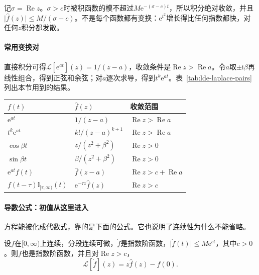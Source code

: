 记$\sigma=\operatorname{Re}z$。$\sigma>c$时被积函数的模不超过$M\mathrm{e}^{-(\sigma-c)t}$，所以积分绝对收敛，并且$\lvert\hat{f}(z)\rvert\leq M/(\sigma-c)$。不是每个函数都有变换：$\mathrm{e}^{t^2}$增长得比任何指数都快，对任何$z$积分都发散。

\paragraph{常用变换对}
直接积分可得$\mathcal{L}[\mathrm{e}^{at}](z)=1/(z-a)$，收敛条件是$\operatorname{Re}z>\operatorname{Re}a$。令$a$取$\pm\mathrm{i}\beta$再线性组合，得到正弦和余弦；对$a$逐次求导，得到$t^k\mathrm{e}^{at}$。表~\ref{tab:lde-laplace-pairs}列出本节用到的结果。

\begin{BookInlineTable}
  \centering
  \caption{常用的单边Laplace变换对，$k$为非负整数，$a\in\mathbb{C}$，$\beta,\tau$为实数，$\tau\geq0$。}
  \label{tab:lde-laplace-pairs}
  \begin{tabular}{lll}
    \toprule
    $f(t)$ & $\hat{f}(z)$ & 收敛范围\\
    \midrule
    $\mathrm{e}^{at}$ & $1/(z-a)$ & $\operatorname{Re}z>\operatorname{Re}a$\\
    $t^k\mathrm{e}^{at}$ & $k!/(z-a)^{k+1}$ & $\operatorname{Re}z>\operatorname{Re}a$\\
    $\cos\beta t$ & $z/(z^2+\beta^2)$ & $\operatorname{Re}z>0$\\
    $\sin\beta t$ & $\beta/(z^2+\beta^2)$ & $\operatorname{Re}z>0$\\
    $\mathrm{e}^{at}f(t)$ & $\hat{f}(z-a)$ & $\operatorname{Re}z>c+\operatorname{Re}a$\\
    $f(t-\tau)\mathbb{I}_{[\tau,\infty)}(t)$ & $\mathrm{e}^{-\tau z}\hat{f}(z)$ & $\operatorname{Re}z>c$\\
    \bottomrule
  \end{tabular}
\end{BookInlineTable}

\paragraph{导数公式：初值从这里进入}
方程能被化成代数式，靠的是下面的公式。它也说明了连续性为什么不能省略。

\begin{theorem}[导数的Laplace变换]
\label{thm:lde-laplace-derivative}
设$f$在$[0,\infty)$上连续，分段连续可微，$\dot{f}$是指数阶函数，$\lvert\dot{f}(t)\rvert\leq M\mathrm{e}^{ct}$，其中$c>0$。则$f$也是指数阶函数，并且对$\operatorname{Re}z>c$，
\begin{equation}
 \mathcal{L}[\dot{f}](z)=z\hat{f}(z)-f(0).
 \label{eq:lde-laplace-derivative}
\end{equation}
\end{theorem}

